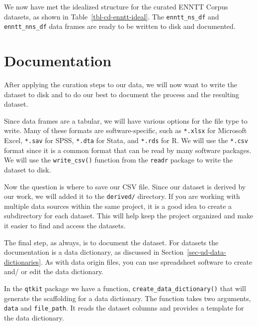 \documentclass[
  letterpaper,
]{latex/krantz}
\theoremstyle{definition}
\theoremstyle{remark}
\begin{document}
We now have met the idealized structure for the curated ENNTT Corpus
datasets, as shown in Table~\ref{tbl-cd-enntt-ideal}. The
\texttt{enntt\_ns\_df} and \texttt{enntt\_nns\_df} data frames are ready
to be written to disk and documented.

\section{Documentation}\label{documentation}

After applying the curation steps to our data, we will now want to write
the dataset to disk and to do our best to document the process and the
resulting dataset.

Since data frames are a tabular, we will have various options for the
file type to write. Many of these formats are software-specific, such as
\texttt{*.xlsx} for Microsoft Excel, \texttt{*.sav} for SPSS,
\texttt{*.dta} for Stata, and \texttt{*.rds} for R. We will use the
\texttt{*.csv} format since it is a common format that can be read by
many software packages. We will use the \texttt{write\_csv()} function
from the \texttt{readr} package to write the dataset to disk.

Now the question is where to save our CSV file. Since our dataset is
derived by our work, we will added it to the \texttt{derived/}
directory. If you are working with multiple data sources within the same
project, it is a good idea to create a subdirectory for each dataset.
This will help keep the project organized and make it easier to find and
access the datasets.

The final step, as always, is to document the dataset. For datasets the
documentation is a data dictionary, as discussed in
Section~\ref{sec-ud-data-dictionaries}. As with data origin files, you
can use spreadsheet software to create and/ or edit the data dictionary.

In the \texttt{qtkit} package we have a function,
\texttt{create\_data\_dictionary()} that will generate the scaffolding
for a data dictionary. The function takes two arguments, \texttt{data}
and \texttt{file\_path}. It reads the dataset columns and provides a
template for the data dictionary.
\end{document}
